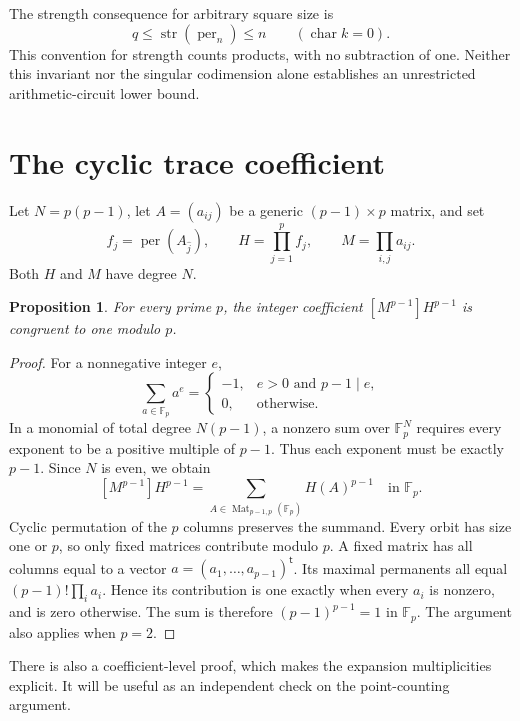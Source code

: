 \documentclass[11pt]{article}
\newtheorem{proposition}[theorem]{Proposition}
\theoremstyle{definition}\newtheorem{definition}[theorem]{Definition}
\theoremstyle{remark}\newtheorem{remark}[theorem]{Remark}
\DeclareMathOperator{\per}{per}
\DeclareMathOperator{\str}{str}
\newcommand{\F}{\mathbb F}
\numberwithin{equation}{section}
\begin{document}
The strength consequence for arbitrary square size is
\begin{equation}\label{eq:introstrength}
 q\le\str(\per_n)\le n\qquad(\operatorname{char}k=0).
\end{equation}
This convention for strength counts products, with no subtraction of
one. Neither this invariant nor the singular codimension alone
establishes an unrestricted arithmetic-circuit lower bound.

\section{The cyclic trace coefficient}
Let $N=p(p-1)$, let $A=(a_{ij})$ be a generic $(p-1)\times p$
matrix, and set
\[
 f_j=\per(A_{\widehat j}),\qquad
 H=\prod_{j=1}^{p}f_j,\qquad M=\prod_{i,j}a_{ij}.
\]
Both $H$ and $M$ have degree $N$.

\begin{proposition}\label{prop:cyclic}
For every prime $p$, the integer coefficient $[M^{p-1}]H^{p-1}$
is congruent to one modulo $p$.
\end{proposition}
\begin{proof}
For a nonnegative integer $e$,
\[
 \sum_{a\in\F_p}a^e=
 \begin{cases}-1,&e>0\text{ and }p-1\mid e,\\
 0,&\text{otherwise}.
 \end{cases}
\]
In a monomial of total degree $N(p-1)$, a nonzero sum over
$\F_p^N$ requires every exponent to be a positive multiple of
$p-1$. Thus each exponent must be exactly $p-1$. Since $N$ is
even, we obtain
\begin{equation}\label{eq:pointsum}
 [M^{p-1}]H^{p-1}=\sum_{A\in\operatorname{Mat}_{p-1,p}(\F_p)}H(A)^{p-1}
 \quad\text{in }\F_p.
\end{equation}
Cyclic permutation of the $p$ columns preserves the summand.
Every orbit has size one or $p$, so only fixed matrices contribute
modulo $p$. A fixed matrix has all columns equal to a vector
$a=(a_1,\ldots,a_{p-1})^{\mathsf t}$. Its maximal permanents all
equal $(p-1)!\prod_i a_i$. Hence its contribution is one exactly
when every $a_i$ is nonzero, and is zero otherwise. The sum is
therefore $(p-1)^{p-1}=1$ in $\F_p$. The argument also applies when
$p=2$.
\end{proof}

There is also a coefficient-level proof, which makes the expansion
multiplicities explicit. It will be useful as an independent check
on the point-counting argument.
\end{document}
